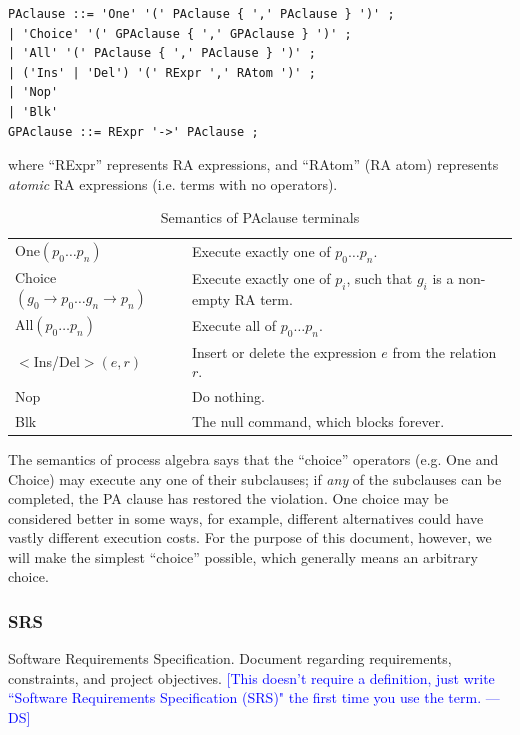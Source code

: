 \documentclass[12pt, svgnames]{article}
\newcommand{\authornote}[3]{\textcolor{#1}{[#3 ---#2]}}
\newcommand{\authornote}[3]{}
\newcommand{\ds}[1]{\authornote{blue}{DS}{#1}}
\begin{document}
\begin{lstlisting}[basicstyle=\ttfamily]
PAclause ::= 'One' '(' PAclause { ',' PAclause } ')' ; 
| 'Choice' '(' GPAclause { ',' GPAclause } ')' ;  
| 'All' '(' PAclause { ',' PAclause } ')' ;  
| ('Ins' | 'Del') '(' RExpr ',' RAtom ')' ; 
| 'Nop'  
| 'Blk' 
GPAclause ::= RExpr '->' PAclause ; 
\end{lstlisting}
where ``RExpr'' represents RA expressions, and ``RAtom'' (RA atom) represents
\emph{atomic} RA expressions (i.e. terms with no operators).

\begin{table}[ht!]\begin{center}\label{tab:PASemantics}
        \caption{Semantics of PAclause terminals}
        \begin{tabularx}{\textwidth}{lX}
            One$(p_0 \ldots p_n)$ & Execute exactly one of $p_0 \ldots p_n$. \\
            Choice$(g_0 \rightarrow p_0 \ldots g_n \rightarrow p_n)$ & Execute 
            exactly
            one of $p_i$, such that $g_i$ is a non-empty RA term. \\
            All$(p_0 \ldots p_n)$ & Execute all of $p_0 \ldots p_n$. \\
            $<$Ins/Del$>(e,r)$ & Insert or delete the expression $e$ from the 
            relation $r$. \\
            Nop & Do nothing. \\
            Blk & The null command, which blocks forever. 
        \end{tabularx}
    \end{center}\end{table}
    
    The semantics of process algebra says that the ``choice'' operators (e.g. 
    One
    and Choice) may execute any one of their subclauses; if \emph{any} of the
    subclauses can be completed, the PA clause has restored the violation.  One
    choice may be considered better in some ways, for example, different
    alternatives could have vastly different execution costs. For the purpose of
    this document, however, we will make the simplest ``choice'' possible, which
    generally means an arbitrary choice. 

\subsubsection*{SRS}
Software Requirements Specification. Document regarding requirements, 
constraints, and project objectives.
\ds{This doesn't require a definition, just write 
``Software Requirements Specification (SRS)" the first time you use the term.}
\end{document}
